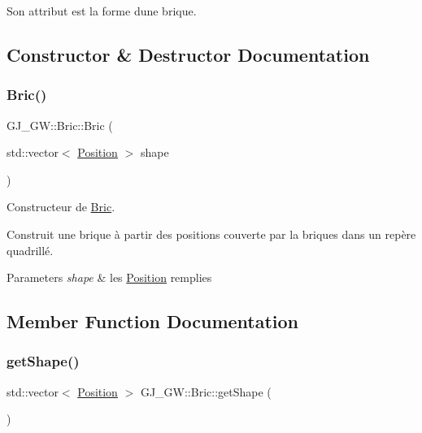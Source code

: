 Son attribut est la forme d\textquotesingle{}une brique. 

\subsection{Constructor \& Destructor Documentation}
\hypertarget{class_g_j___g_w_1_1_bric_a40de84f37b5db5de3e77a742220a9e58}{}\label{class_g_j___g_w_1_1_bric_a40de84f37b5db5de3e77a742220a9e58} 
\subsubsection{\texorpdfstring{Bric()}{Bric()}}
{\footnotesize\ttfamily G\+J\+\_\+\+G\+W\+::\+Bric\+::\+Bric (\begin{DoxyParamCaption}\item[{std\+::vector$<$ \hyperlink{class_g_j___g_w_1_1_position}{Position} $>$}]{shape }\end{DoxyParamCaption})}



Constructeur de \hyperlink{class_g_j___g_w_1_1_bric}{Bric}. 

Construit une brique à partir des positions couverte par la briques dans un repère quadrillé.


\begin{DoxyParams}{Parameters}
{\em shape} & les \hyperlink{class_g_j___g_w_1_1_position}{Position} remplies \\
\hline
\end{DoxyParams}


\subsection{Member Function Documentation}
\hypertarget{class_g_j___g_w_1_1_bric_a910b13826a68894212c8735613625a80}{}\label{class_g_j___g_w_1_1_bric_a910b13826a68894212c8735613625a80} 
\subsubsection{\texorpdfstring{get\+Shape()}{getShape()}}
{\footnotesize\ttfamily std\+::vector$<$ \hyperlink{class_g_j___g_w_1_1_position}{Position} $>$ G\+J\+\_\+\+G\+W\+::\+Bric\+::get\+Shape (\begin{DoxyParamCaption}{ }\end{DoxyParamCaption})\hspace{0.3cm}{\ttfamily [inline]}}



